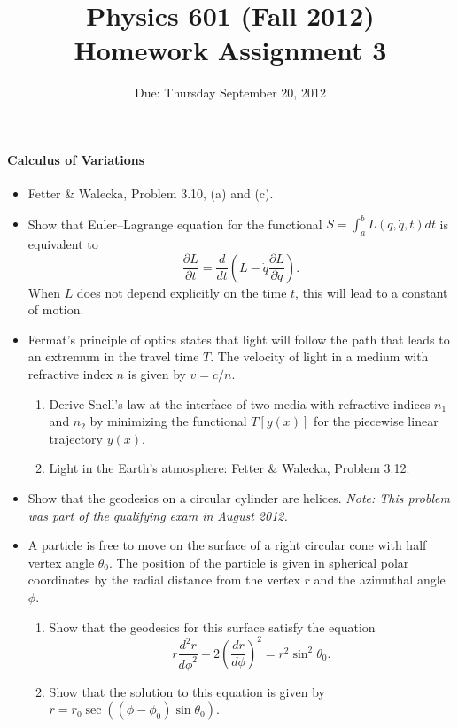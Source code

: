 \documentclass[letterpaper,11pt]{article}
\title{Physics 601 (Fall 2012) \\ Homework Assignment 3}
\date{Due: Thursday September 20, 2012}
\begin{document}
\maketitle

\paragraph*{Calculus of Variations}
\begin{itemize}
 \item Fetter \& Walecka, Problem 3.10, (a) and (c).
 \item Show that Euler--Lagrange equation for the functional $S = \int_a^b L(q,\dot{q},t) dt$ is equivalent to
  \begin{equation}
   \frac{\partial L}{\partial t} = \frac{d}{dt} \left( L - \dot{q} \frac{\partial L}{\partial \dot{q}} \right).
  \end{equation}
 When $L$ does not depend explicitly on the time $t$, this will lead to a constant of motion.
 \item Fermat's principle of optics states that light will follow the path that leads to an extremum in the travel time $T$.  The velocity of light in a medium with refractive index $n$ is given by $v = c/n$.
 \begin{enumerate}
  \item Derive Snell's law at the interface of two media with refractive indices $n_1$ and $n_2$ by minimizing the functional $T[y(x)]$ for the piecewise linear trajectory $y(x)$.
  \item Light in the Earth's atmosphere: Fetter \& Walecka, Problem 3.12.
 \end{enumerate}
 \item Show that the geodesics on a circular cylinder are helices.  \textit{Note: This problem was part of the qualifying exam in August 2012.}
 \item A particle is free to move on the surface of a right circular cone with half vertex angle $\theta_0$.  The position of the particle is given in spherical polar coordinates by the radial distance from the vertex $r$ and the azimuthal angle $\phi$.
 \begin{enumerate}
  \item Show that the geodesics for this surface satisfy the equation
  \begin{equation*}
   r \frac{d^2 r}{d\phi^2} - 2 \left( \frac{dr}{d\phi} \right)^2 = r^2 \sin^2 \theta_0.
  \end{equation*}
  \item Show that the solution to this equation is given by $r = r_0 \sec \left( \left(\phi - \phi_0\right) \sin \theta_0 \right)$.
 \end{enumerate}
\end{itemize}
\end{document}
